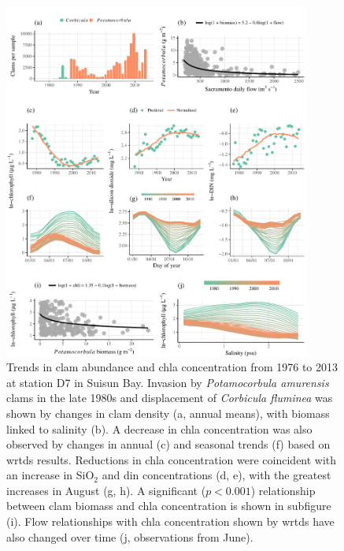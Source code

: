 \documentclass[journal = esthag, manuscript = article]{achemso}\usepackage[]{graphicx}\usepackage[]{color}
\begin{document}
\begin{figure}[!ht]

{\centering \includegraphics[width=0.9\textwidth]{figs/clmchl-1} 

}

\caption{Trends in clam abundance and \ac{chla} concentration from 1976 to 2013 at station D7 in Suisun Bay.  Invasion by \textit{Potamocorbula amurensis} clams in the late 1980s and displacement of \textit{Corbicula fluminea} was shown by changes in clam density (a, annual means), with biomass linked to salinity (b).  A decrease in \ac{chla} concentration was also observed by changes in annual (c) and seasonal trends (f) based on \ac{wrtds} results.  Reductions in \ac{chla} concentration were coincident with an increase in SiO$_2$ and \ac{din} concentrations (d, e), with the greatest increases in August (g, h). A significant ($p < 0.001$) relationship between clam biomass and \ac{chla} concentration is shown in subfigure (i).  Flow relationships with \ac{chla} concentration shown by \ac{wrtds} have also changed over time (j, observations from June).}\label{fig:clmchl}
\end{figure}



\clearpage
\end{document}
